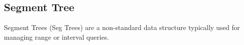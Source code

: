 \subsection*{Segment Tree}

Segment Trees (Seg Trees) are a non-standard data structure typically used for managing range or interval queries.